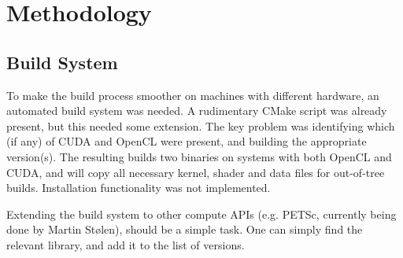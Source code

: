 \chapter{Methodology}
\section{Build System}
To make the build process smoother on machines with different hardware, an automated build system was needed. A rudimentary CMake script was already present, but this needed some extension. The key problem was identifying which (if any) of CUDA and OpenCL were present, and building the appropriate version(s). The resulting builds two binaries on systems with both OpenCL and CUDA, and will copy all necessary kernel, shader and data files for out-of-tree builds. Installation functionality was not implemented.

Extending the build system to other compute APIs (e.g. PETSc, currently being done by Martin Stølen), should be a simple task. One can simply find the relevant library, and add it to the list of versions.

